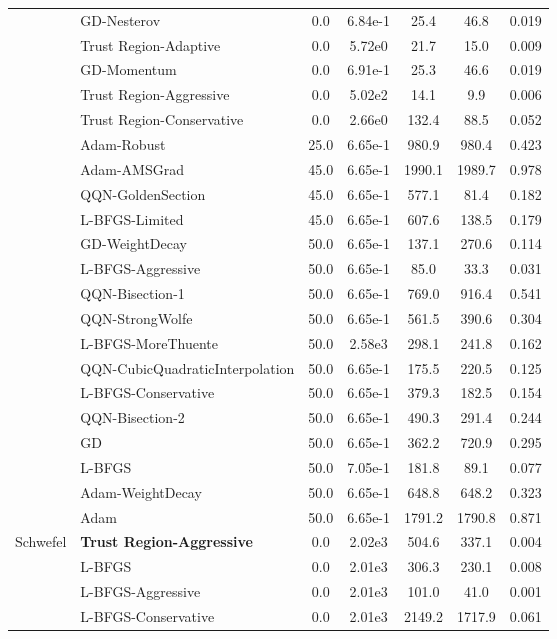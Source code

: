 \documentclass{article}
\begin{document}
\begin{table}[htbp]
{\begin{tabular}{p{2.5cm}p{2.5cm}*{5}{c}}
 & GD-Nesterov & 0.0 & 6.84e-1 & 25.4 & 46.8 & 0.019 \\
 & Trust Region-Adaptive & 0.0 & 5.72e0 & 21.7 & 15.0 & 0.009 \\
 & GD-Momentum & 0.0 & 6.91e-1 & 25.3 & 46.6 & 0.019 \\
 & Trust Region-Aggressive & 0.0 & 5.02e2 & 14.1 & 9.9 & 0.006 \\
 & Trust Region-Conservative & 0.0 & 2.66e0 & 132.4 & 88.5 & 0.052 \\
 & Adam-Robust & 25.0 & 6.65e-1 & 980.9 & 980.4 & 0.423 \\
 & Adam-AMSGrad & 45.0 & 6.65e-1 & 1990.1 & 1989.7 & 0.978 \\
 & QQN-GoldenSection & 45.0 & 6.65e-1 & 577.1 & 81.4 & 0.182 \\
 & L-BFGS-Limited & 45.0 & 6.65e-1 & 607.6 & 138.5 & 0.179 \\
 & GD-WeightDecay & 50.0 & 6.65e-1 & 137.1 & 270.6 & 0.114 \\
 & L-BFGS-Aggressive & 50.0 & 6.65e-1 & 85.0 & 33.3 & 0.031 \\
 & QQN-Bisection-1 & 50.0 & 6.65e-1 & 769.0 & 916.4 & 0.541 \\
 & QQN-StrongWolfe & 50.0 & 6.65e-1 & 561.5 & 390.6 & 0.304 \\
 & L-BFGS-MoreThuente & 50.0 & 2.58e3 & 298.1 & 241.8 & 0.162 \\
 & QQN-CubicQuadraticInterpolation & 50.0 & 6.65e-1 & 175.5 & 220.5 & 0.125 \\
 & L-BFGS-Conservative & 50.0 & 6.65e-1 & 379.3 & 182.5 & 0.154 \\
 & QQN-Bisection-2 & 50.0 & 6.65e-1 & 490.3 & 291.4 & 0.244 \\
 & GD & 50.0 & 6.65e-1 & 362.2 & 720.9 & 0.295 \\
 & L-BFGS & 50.0 & 7.05e-1 & 181.8 & 89.1 & 0.077 \\
 & Adam-WeightDecay & 50.0 & 6.65e-1 & 648.8 & 648.2 & 0.323 \\
 & Adam & 50.0 & 6.65e-1 & 1791.2 & 1790.8 & 0.871 \\
\midrule
\multirow{25}{*}{Schwefel} & \textbf{Trust Region-Aggressive} & 0.0 & 2.02e3 & 504.6 & 337.1 & 0.004 \\
 & L-BFGS & 0.0 & 2.01e3 & 306.3 & 230.1 & 0.008 \\
 & L-BFGS-Aggressive & 0.0 & 2.01e3 & 101.0 & 41.0 & 0.001 \\
 & L-BFGS-Conservative & 0.0 & 2.01e3 & 2149.2 & 1717.9 & 0.061 \\

\end{tabular}}
\end{table}
\end{document}
